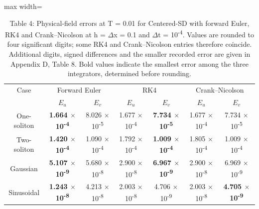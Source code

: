 \documentclass{article}
\theoremstyle{plain}
\theoremstyle{definition}
\begin{document}
\begin{table}[!htbp]
\centering
\caption*{Table 4: Physical-field errors at T = 0.01 for Centered-SD with forward Euler, RK4 and Crank–Nicolson at h = \(\Delta\)x = 0.1 and \(\Delta\)t = 10\textsuperscript{-}\textsuperscript{4}. Values are rounded to four significant digits; some RK4 and Crank–Nicolson entries therefore coincide. Additional digits, signed differences and the smaller recorded error are given in Appendix D, Table 8. Bold values indicate the smallest error among the three integrators, determined before rounding.}
\normalsize
\setlength{\tabcolsep}{6pt}
\renewcommand{\arraystretch}{1.25}\setlength{\extrarowheight}{1pt}
\setlength{\tabcolsep}{4pt}
\begin{adjustbox}{max width=\linewidth}
\begin{tabular}{ccccccc}

\hline
\multicolumn{1}{c}{Case} & \multicolumn{2}{c}{Forward Euler} & \multicolumn{2}{c}{RK4} & \multicolumn{2}{c}{Crank–Nicolson} \\
 & \multicolumn{1}{c}{\(E_u\)} & \multicolumn{1}{c}{\(E_v\)} & \multicolumn{1}{c}{\(E_u\)} & \multicolumn{1}{c}{\(E_v\)} & \multicolumn{1}{c}{\(E_u\)} & \multicolumn{1}{c}{\(E_v\)} \\
\hline
One-soliton & \textbf{1.664 \(\times\) 10\textsuperscript{-4}} & 8.026 \(\times\) 10\textsuperscript{-5} & 1.677 \(\times\) 10\textsuperscript{-4} & \textbf{7.734 \(\times\) 10\textsuperscript{-5}} & 1.677 \(\times\) 10\textsuperscript{-4} & 7.734 \(\times\) 10\textsuperscript{-5} \\
Two-soliton & \textbf{1.420 \(\times\) 10\textsuperscript{-4}} & 1.090 \(\times\) 10\textsuperscript{-4} & 1.792 \(\times\) 10\textsuperscript{-4} & \textbf{1.009 \(\times\) 10\textsuperscript{-4}} & 1.805 \(\times\) 10\textsuperscript{-4} & 1.009 \(\times\) 10\textsuperscript{-4} \\
Gaussian & \textbf{5.107 \(\times\) 10\textsuperscript{-9}} & 5.680 \(\times\) 10\textsuperscript{-8} & 2.900 \(\times\) 10\textsuperscript{-8} & \textbf{6.967 \(\times\) 10\textsuperscript{-9}} & 2.900 \(\times\) 10\textsuperscript{-8} & 6.969 \(\times\) 10\textsuperscript{-9} \\
Sinusoidal & \textbf{1.243 \(\times\) 10\textsuperscript{-8}} & 4.213 \(\times\) 10\textsuperscript{-8} & 2.003 \(\times\) 10\textsuperscript{-8} & 4.706 \(\times\) 10\textsuperscript{-9} & 2.003 \(\times\) 10\textsuperscript{-8} & \textbf{4.705 \(\times\) 10\textsuperscript{-9}} \\
\hline
\end{tabular}
\end{adjustbox}
\end{table}
\end{document}
